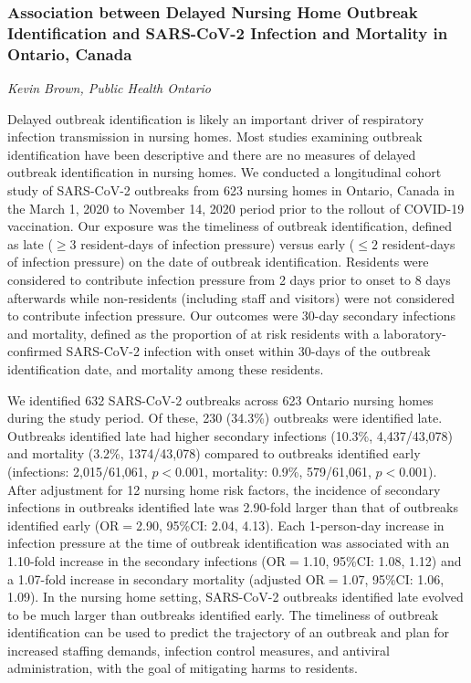\subsubsection*{Association between Delayed Nursing Home Outbreak Identification and
SARS-CoV-2 Infection and Mortality in Ontario, Canada}
\textit{Kevin Brown, Public Health Ontario}

Delayed outbreak identification is likely an important driver of respiratory
infection transmission in nursing homes. Most studies examining outbreak
identification have been descriptive and there are no measures of delayed
outbreak identification in nursing homes. We conducted a longitudinal cohort
study of SARS-CoV-2 outbreaks from 623 nursing homes in Ontario, Canada in the
March 1, 2020 to November 14, 2020 period prior to the rollout of COVID-19
vaccination. Our exposure was the timeliness of outbreak identification, defined
as late ($\ge3$ resident-days of infection pressure) versus early
($\le2$ resident-days of infection pressure) on the date of outbreak
identification. Residents were considered to contribute infection pressure from
2 days prior to onset to 8 days afterwards while non-residents (including staff
and visitors) were not considered to contribute infection pressure. Our outcomes
were 30-day secondary infections and mortality, defined as the proportion of at
risk residents with a laboratory-confirmed SARS-CoV-2 infection with onset
within 30-days of the outbreak identification date, and mortality among these
residents. 

We identified 632 SARS-CoV-2 outbreaks across 623 Ontario nursing
homes during the study period. Of these, 230 (34.3\%) outbreaks were identified
late. Outbreaks identified late had higher secondary
infections (10.3\%, 4,437/43,078) and mortality (3.2\%, 1374/43,078) compared to
outbreaks identified early (infections: 2,015/61,061, $p<0.001$, mortality: 0.9\%,
579/61,061, $p<0.001$). After adjustment for 12 nursing home risk factors, the
incidence of secondary infections in outbreaks identified late was 2.90-fold
larger than that of outbreaks identified early (OR$=$2.90, 95\%CI: 2.04, 4.13).
Each 1-person-day increase in infection pressure at the time of outbreak
identification was associated with an 1.10-fold increase in the secondary
infections (OR$=$1.10, 95\%CI: 1.08, 1.12) and a 1.07-fold increase in secondary
mortality (adjusted OR$=$1.07, 95\%CI: 1.06, 1.09). In the nursing home setting,
SARS-CoV-2 outbreaks identified late evolved to be much larger than outbreaks
identified early. The timeliness of outbreak identification can be used to
predict the trajectory of an outbreak and plan for increased staffing demands,
infection control measures, and antiviral administration, with the goal of
mitigating harms to residents.

